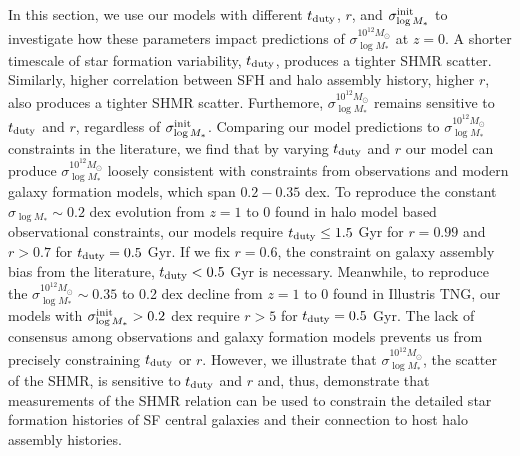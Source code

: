 \documentclass[12pt, letterpaper, preprint, tighten]{aastex62}
\newcommand{\edt}[1]{{\color{dred}{\bf} #1}}
\newcommand{\tduty}{t_{\rm duty}}
\newcommand{\siglogm}{\sigma_{\log M_*}}
\begin{document}
\edt{In this section, we use our models with different $\tduty$, $r$, and 
$\siglogm^{\rm init}$ to investigate how these parameters impact predictions 
of $\siglogm^{10^{12}M_\odot}$ at $z=0$. A shorter timescale of star 
formation variability, $\tduty$, produces a tighter SHMR scatter. Similarly,
higher correlation between SFH and halo assembly history, higher $r$, also 
produces a tighter SHMR scatter. Furthemore, $\siglogm^{10^{12}M_\odot}$ 
remains sensitive to $\tduty$ and $r$, regardless of $\siglogm^{\rm init}$. 
Comparing our model predictions to $\siglogm^{10^{12}M_\odot}$ constraints 
in the literature, we find that by varying $\tduty$ and $r$ our model can 
produce $\siglogm^{10^{12}M_\odot}$ loosely consistent with constraints 
from observations and modern galaxy formation models, which span $0.2 - 0.35$ dex. 
To reproduce the constant $\siglogm \sim 0.2$ dex evolution from $z=1$ to 0 
found in halo model based observational constraints, our models require 
$\tduty \leq 1.5$ Gyr for $r = 0.99$ and $r > 0.7$ for $\tduty = 0.5$ Gyr. 
If we fix $r = 0.6$, the constraint on galaxy assembly bias from the literature, 
$\tduty < 0.5$ Gyr is necessary. Meanwhile, to reproduce the 
$\siglogm^{10^{12}M_\odot}\sim 0.35$ to 0.2 dex decline from $z=1$ 
to 0 found in Illustris TNG, our models with $\siglogm^{\rm init} > 0.2$ dex 
require $r > 5$ for $\tduty = 0.5$ Gyr. The lack of consensus among observations 
and galaxy formation models prevents us from precisely constraining $\tduty$ or $r$. 
However, we illustrate that $\siglogm^{10^{12}M_\odot}$, the scatter of 
the SHMR, is sensitive to $\tduty$ and $r$ and, thus, demonstrate that measurements
of the SHMR relation can be used to constrain the detailed star formation histories 
of SF central galaxies and their connection to host halo assembly histories.
}
\end{document}
